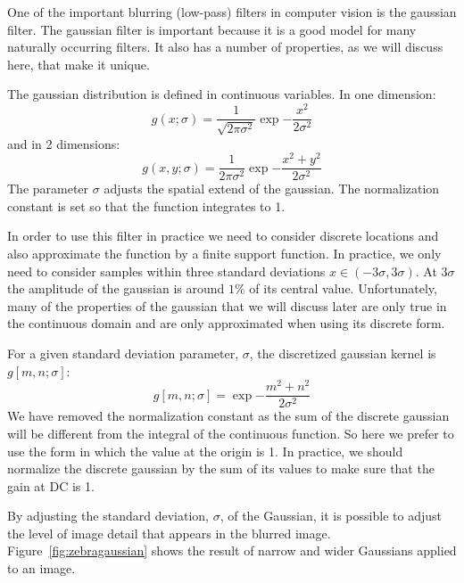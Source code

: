 One of the important blurring (low-pass) filters in computer vision is the gaussian filter. The gaussian filter is important because it is a good model for many naturally occurring filters. It also has a number of properties, as we will discuss here, that make it unique.

The gaussian distribution is defined in continuous variables. In one dimension:
\begin{equation}
	g(x; \sigma) = \frac{1}{\sqrt{2 \pi \sigma^2}} \exp{-\frac{x^2}{2 \sigma^2}}
	\label{eq:gauss1dcont}
\end{equation}
and in 2 dimensions:
\begin{equation}
	g(x,y; \sigma) = \frac{1}{2 \pi \sigma^2} \exp{-\frac{x^2 +
			y^2}{2 \sigma^2}}
	\label{eq:gauss2dcont}
\end{equation}
The parameter $\sigma$ adjusts the spatial extend of the gaussian. The normalization constant is set so that the function integrates to 1.

In order to use this filter in practice we need to consider discrete locations and also approximate the function by a finite support function. In practice, we only need to consider samples within three standard deviations $x \in (-3\sigma, 3\sigma)$. At $3\sigma$ the amplitude of the gaussian is around $1\%$ of its central value. Unfortunately, many of the properties of the gaussian that we will discuss later are only true in the continuous domain and are only approximated when using its discrete form.

For a given standard deviation parameter, $\sigma$, the discretized gaussian kernel is $g \left[m, n; \sigma \right]$:
\begin{equation}
	g \left[ m,n; \sigma \right] = \exp{-\frac{m^2 +
			n^2}{2 \sigma^2}}
	\label{eq:gauss2d}
\end{equation}
We have removed the normalization constant as the sum of the discrete gaussian will be different from the integral of the continuous function. So here we prefer to use the form in which the value at the origin is 1. In practice, we should normalize the discrete gaussian by the sum of its values to make sure that the gain at DC is 1.

By adjusting the standard deviation, $\sigma$, of the Gaussian, it is possible to adjust the level of image detail
that appears in the blurred image. Figure~\ref{fig:zebragaussian} shows the result of narrow and wider Gaussians applied to an image.


